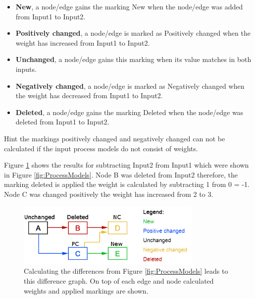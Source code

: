 \documentclass{llncs}
\begin{document}
\begin{itemize}
	\item \textbf{New}, a node/edge gains the marking New when the node/edge was added from Input1 to Input2.
	\item \textbf{Positively changed}, a node/edge is marked as Positively changed when the weight has increased from Input1 to Input2.
	\item \textbf{Unchanged}, a node/edge gains this marking when its value matches in both inputs.
	\item \textbf{Negatively changed}, a node/edge is marked as Negatively changed when the weight has decreased from Input1 to Input2.
	\item \textbf{Deleted}, a node/edge gains the marking Deleted when the node/edge was deleted from Input1 to Input2.
\end{itemize}

Hint the markings positively changed and negatively changed can not be calculated if the input process models do not consist of weights.

Figure \ref{fig:DiffGraphCalculation} shows the results for subtracting Input2 from Input1 which were shown in Figure \ref{fig:ProcessModels}. Node B  was deleted from Input2 therefore, the marking deleted is applied the weight is calculated by subtracting 1 from 0 = -1. Node C was changed positively the weight has increased from 2 to 3.

\begin{figure}
	\centering
	\includegraphics[width=0.8\textwidth]{Images/ResultGraph.PNG}
	\caption{Calculating the differences from Figure \ref{fig:ProcessModels} leads to this difference graph. On top of each edge and node calculated weights and applied markings are shown.
	}
	\label{fig:DiffGraphCalculation}
\end{figure}
\end{document}
